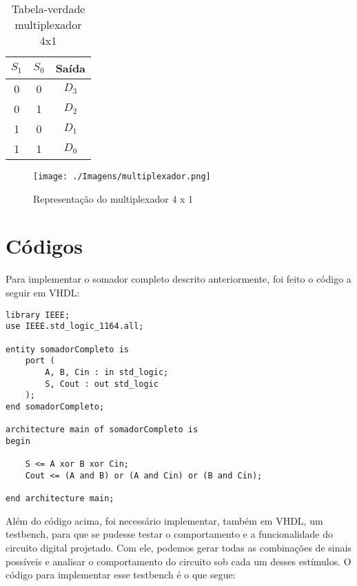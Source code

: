 \documentclass[a4paper,12pt]{article}
\newenvironment{code}{\captionsetup{type=listing}}{}
\begin{document}
\begin{table}[H]
    \centering
    \begin{tabular}{|c|c|c|}
        \hline
        $S_1$ & $S_0$ & Saída \\ \hline
        0 & 0 & $D_3$ \\ \hline
        0 & 1 & $D_2$ \\ \hline
        1 & 0 & $D_1$ \\ \hline
        1 & 1 & $D_0$ \\ \hline
    \end{tabular}
    \caption{Tabela-verdade multiplexador 4x1}
\end{table}

\begin{figure}[H]
    \centering
    \texttt{[image: ./Imagens/multiplexador.png]}
    \caption{Representação do multiplexador 4 x 1}
\end{figure}

\section{Códigos}
Para implementar o somador completo descrito anteriormente, foi feito o código a seguir em VHDL:

\begin{code}
\begin{verbatim}
library IEEE;
use IEEE.std_logic_1164.all;

entity somadorCompleto is
    port (
        A, B, Cin : in std_logic;
        S, Cout : out std_logic
    );
end somadorCompleto;

architecture main of somadorCompleto is
begin

    S <= A xor B xor Cin;
    Cout <= (A and B) or (A and Cin) or (B and Cin);

end architecture main;
\end{verbatim}
\vspace{10pt}
\end{code}

Além do código acima, foi necessário implementar, também em VHDL, um testbench, para que se pudesse testar o comportamento e a funcionalidade do circuito digital projetado. Com ele, podemos gerar todas as combinações de sinais possíveis e analisar o comportamento do circuito sob cada um desses estímulos. O código para implementar esse testbench é o que segue:
\end{document}
